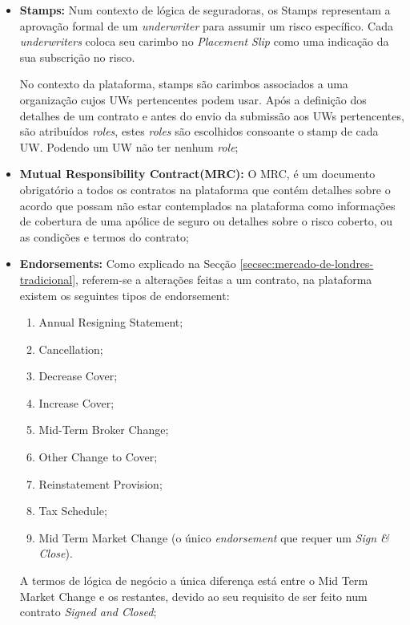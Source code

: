 \begin{itemize}
            \item \textbf{Stamps:} Num contexto de lógica de seguradoras, os Stamps representam a aprovação formal de um \textit{underwriter} para assumir um risco específico. Cada \textit{underwriters} coloca seu carimbo no \textit{Placement Slip} como uma indicação da sua subscrição no risco.

            No contexto da plataforma, stamps são carimbos associados a uma organização cujos UWs pertencentes podem usar. Após a definição dos detalhes de um contrato e antes do envio da submissão aos UWs pertencentes, são atribuídos \textit{roles}, estes \textit{roles} são escolhidos consoante o stamp de cada UW. Podendo um UW não ter nenhum \textit{role};
                
            \item \textbf{Mutual Responsibility Contract(MRC):} O MRC, é um documento obrigatório a todos os contratos na plataforma que contém detalhes sobre o acordo que possam não estar contemplados na plataforma como informações de cobertura de uma apólice de seguro ou detalhes sobre o risco coberto, ou as condições e termos do contrato;

            \item \textbf{Endorsements:} Como explicado na Secção \ref{secsec:mercado-de-londres-tradicional}, referem-se a alterações feitas a um contrato, na plataforma existem os seguintes tipos de endorsement:
            \begin{enumerate}
                \item Annual Resigning Statement;
                \item Cancellation;
                \item Decrease Cover;
                \item Increase Cover;
                \item Mid-Term Broker Change;
                \item Other Change to Cover;
                \item Reinstatement Provision;
                \item Tax Schedule;
                \item Mid Term Market Change (o único \textit{endorsement} que requer um \textit{Sign \& Close}).
            \end{enumerate}
            A termos de lógica de negócio a única diferença está entre o Mid Term Market Change e os restantes, devido ao seu requisito de ser feito num contrato \textit{Signed and Closed};


\end{itemize}
